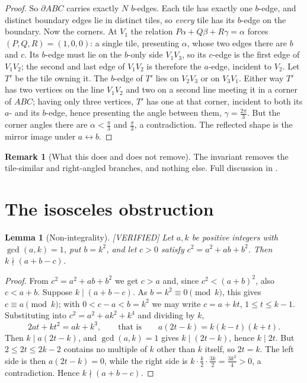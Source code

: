 \documentclass[11pt,reqno]{amsart}
\theoremstyle{plain}
\newtheorem{lemma}[theorem]{Lemma}
\theoremstyle{definition}
\newtheorem{remark}[theorem]{Remark}
\newcommand{\lab}[1]{\hfill\textnormal{\footnotesize\textsc{[#1]}}}
\begin{document}
\begin{proof}
So $\partial ABC$ carries exactly $N$ $b$-edges. Each tile has exactly one $b$-edge, and distinct
boundary edges lie in distinct tiles, so \emph{every} tile has its $b$-edge on the boundary. Now the
corners. At $V_1$ the relation $P\alpha+Q\beta+R\gamma=\alpha$ forces $(P,Q,R)=(1,0,0)$: a single
tile, presenting $\alpha$, whose two edges there are $b$ and $c$. Its $b$-edge must lie on the
$b$-only side $V_1V_3$, so its $c$-edge is the first edge of $V_1V_2$; the second and last edge of
$V_1V_2$ is therefore the $a$-edge, incident to $V_2$. Let $T'$ be the tile owning it. The $b$-edge
of $T'$ lies on $V_2V_3$ or on $V_3V_1$. Either way $T'$ has two vertices on the line $V_1V_2$ and
two on a second line meeting it in a corner of $ABC$; having only three vertices, $T'$ has one at
that corner, incident to both its $a$- and its $b$-edge, hence presenting the angle between them,
$\gamma=\frac{2\pi}3$. But the corner angles there are $\alpha<\frac\pi3$ and $\frac\pi3$, a
contradiction. The reflected shape is the mirror image under $a\leftrightarrow b$.
\end{proof}

\begin{remark}[What this does and does not remove]\label{rem:productscope}
The invariant removes the tile-similar and right-angled branches, and nothing else. Full discussion in \cite{Obstructions}.
\end{remark}

\section{The isosceles obstruction}\label{sec:isosceles}

\begin{lemma}[Non-integrality]\label{lem:nonint}\lab{VERIFIED}
Let $a,k$ be positive integers with $\gcd(a,k)=1$, put $b=k^2$, and let $c>0$ satisfy
$c^2=a^2+ab+b^2$. Then $k\nmid(a+b-c)$.
\end{lemma}

\begin{proof}
From $c^2=a^2+ab+b^2$ we get $c>a$ and, since $c^2<(a+b)^2$, also $c<a+b$. Suppose
$k\mid(a+b-c)$. As $b=k^2\equiv0\pmod k$, this gives $c\equiv a\pmod k$; with $0<c-a<b=k^2$ we may
write $c=a+kt$, $1\le t\le k-1$. Substituting into $c^2=a^2+ak^2+k^4$ and dividing by $k$,
\[
2at+kt^2=ak+k^3,\qquad\text{that is}\qquad a(2t-k)=k(k-t)(k+t).
\]
Then $k\mid a(2t-k)$, and $\gcd(a,k)=1$ gives $k\mid(2t-k)$, hence $k\mid 2t$. But $2\le2t\le2k-2$
contains no multiple of $k$ other than $k$ itself, so $2t=k$. The left side is then $a(2t-k)=0$,
while the right side is $k\cdot\frac k2\cdot\frac{3k}2=\frac{3k^3}4>0$, a contradiction. Hence
$k\nmid(a+b-c)$.
\end{proof}
\end{document}
